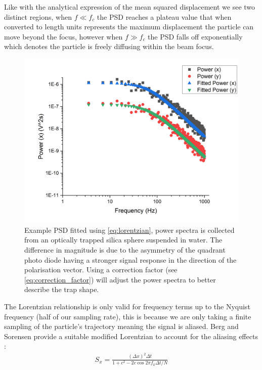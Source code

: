 Like with the analytical expression of the mean squared displacement we 
see two distinct regions, when $f\ll f_c$ the PSD reaches a plateau value 
that when converted to length units represents the maximum displacement 
the particle can move beyond the focus, however when $f\gg f_c$ the 
PSD falls off exponentially which denotes the particle is freely diffusing 
within the beam focus.
\begin{figure}[h!]
	\centering
	\includegraphics[width=\linewidth]{PSD.png}
	\caption{Example PSD fitted using \eqref{eq:lorentzian}, power spectra is collected from an optically trapped silica sphere suspended in water. The difference in magnitude is due to the asymmetry of the quadrant photo diode having a stronger signal response in the direction of the polarisation vector. Using a correction factor (see \eqref{eq:correction_factor}) will adjust the power spectra to better describe the trap shape.}
\end{figure}

The Lorentzian relationship is only valid for frequency terms up to 
the Nyquist frequency (half of our sampling rate), this is because we 
are only taking a finite sampling of the particle's trajectory meaning 
the signal is aliased. Berg and Sorensen provide a suitable modified 
Lorentzian to account for the aliasing effects \cite{BergSoerensen2004}:
\begin{align}
	\label{eq:alaised_lorentzian}
	S_x = \frac{(\Delta x)^2\Delta t}{1+c^2-2c\cos{2\pi f_k\Delta t/N}}
\end{align}

